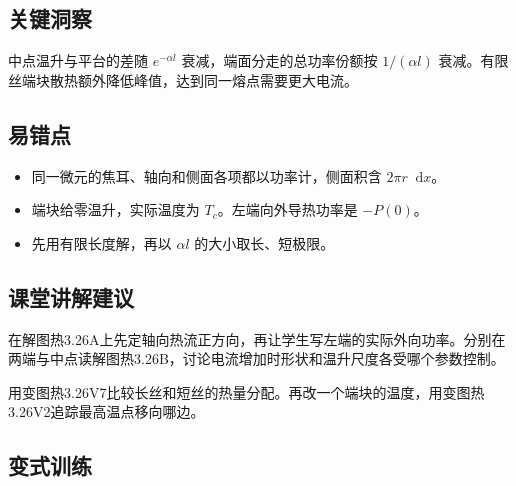 \documentclass[UTF8,fontset=fandol,a4paper,11pt]{ctexart}
\newcommand{\dd}{\mathop{}\!\mathrm{d}}
\begin{document}


\subsection*{关键洞察}

中点温升与平台的差随 $e^{-\alpha l}$ 衰减，端面分走的总功率份额按 $1/(\alpha l)$ 衰减。有限丝端块散热额外降低峰值，达到同一熔点需要更大电流。



\subsection*{易错点}

\begin{itemize}
\item 同一微元的焦耳、轴向和侧面各项都以功率计，侧面积含 $2\pi r\dd x$。
\item 端块给零温升，实际温度为 $T_c$。左端向外导热功率是 $-P(0)$。
\item 先用有限长度解，再以 $\alpha l$ 的大小取长、短极限。
\end{itemize}



\subsection*{课堂讲解建议}

在解图热3.26A上先定轴向热流正方向，再让学生写左端的实际外向功率。分别在两端与中点读解图热3.26B，讨论电流增加时形状和温升尺度各受哪个参数控制。

用变图热3.26V7比较长丝和短丝的热量分配。再改一个端块的温度，用变图热3.26V2追踪最高温点移向哪边。



\subsection*{变式训练}
\end{document}
